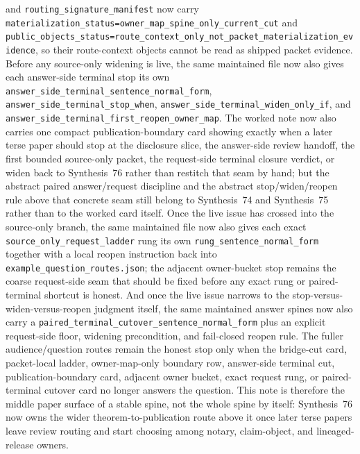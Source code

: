 \documentclass[11pt]{article}
\begin{document}
and \texttt{routing\_signature\_manifest} now carry \texttt{materialization\_status=owner\_map\_spine\_only\_current\_cut} and \texttt{public\_objects\_status=route\_context\_only\_not\_packet\_materialization\_evidence}, so their route-context objects cannot be read as shipped packet evidence. Before any source-only widening is live, the same maintained file now also gives each answer-side terminal stop its own \texttt{answer\_side\_terminal\_sentence\_normal\_form}, \texttt{answer\_side\_terminal\_stop\_when}, \texttt{answer\_side\_terminal\_widen\_only\_if}, and \texttt{answer\_side\_terminal\_first\_reopen\_owner\_map}. The worked note now also carries one compact publication-boundary card showing exactly when a later terse paper should stop at the disclosure slice, the answer-side review handoff, the first bounded source-only packet, the request-side terminal closure verdict, or widen back to Synthesis~76 rather than restitch that seam by hand; but the abstract paired answer/request discipline and the abstract stop/widen/reopen rule above that concrete seam still belong to Synthesis~74 and Synthesis~75 rather than to the worked card itself. Once the live issue has crossed into the source-only branch, the same maintained file now also gives each exact \texttt{source\_only\_request\_ladder} rung its own \texttt{rung\_sentence\_normal\_form} together with a local reopen instruction back into \nolinkurl{example\_question\_routes.json}; the adjacent owner-bucket stop remains the coarse request-side seam that should be fixed before any exact rung or paired-terminal shortcut is honest. And once the live issue narrows to the stop-versus-widen-versus-reopen judgment itself, the same maintained answer spines now also carry a \texttt{paired\_terminal\_cutover\_sentence\_normal\_form} plus an explicit request-side floor, widening precondition, and fail-closed reopen rule. The fuller audience/question routes remain the honest stop only when the bridge-cut card, packet-local ladder, owner-map-only boundary row, answer-side terminal cut, publication-boundary card, adjacent owner bucket, exact request rung, or paired-terminal cutover card no longer answers the question. This note is therefore the middle paper surface of a stable spine, not the whole spine by itself: Synthesis~76 now owns the wider theorem-to-publication route above it once later terse papers leave review routing and start choosing among notary, claim-object, and lineaged-release owners.\cite{series:mathcrosswalk,series:workedexample,series:pairedterminalcitationdiscipline,series:pairedterminalcutoverrules,series:theoremtopublicationspine}
\end{document}
